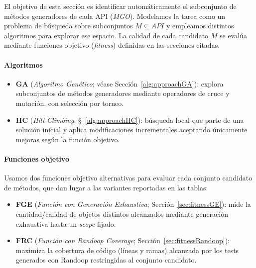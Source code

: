 El objetivo de esta sección es identificar automáticamente el subconjunto de métodos generadores de cada API (\emph{MGO}). 
Modelamos la tarea como un problema de búsqueda sobre subconjuntos \(M \subseteq API\) y empleamos distintos algoritmos 
para explorar ese espacio. La calidad de cada candidato \(M\) se evalúa mediante funciones objetivo 
(\emph{fitness}) definidas en las secciones citadas.

\paragraph{Algoritmos}
\begin{itemize}
  \item \textbf{GA} (\emph{Algoritmo Genético}; véase Sección~\ref{alg:approachGA}): explora subconjuntos de métodos generadores mediante operadores de cruce y mutación, con selección por torneo.
  \item \textbf{HC} (\emph{Hill-Climbing}; \S~\ref{alg:approachHC}): búsqueda local que parte de una solución inicial y aplica modificaciones incrementales aceptando únicamente mejoras según la función objetivo.
\end{itemize}

\paragraph{Funciones objetivo}
Usamos dos funciones objetivo alternativas para evaluar cada conjunto candidato de métodos, 
que dan lugar a las variantes reportadas en las tablas:

\begin{itemize}
  \item \textbf{FGE} (\emph{Función con Generación Exhaustiva}; Sección~\ref{sec:fitnessGE}):
mide la cantidad/calidad de objetos distintos alcanzados mediante generación exhaustiva hasta un \emph{scope} fijado.
  \item \textbf{FRC} (\emph{Función con Randoop Coverage}; Sección~\ref{sec:fitnessRandoop}): maximiza la cobertura de código (líneas y ramas) alcanzada por los tests generados con Randoop restringidas al conjunto candidato. 
\end{itemize}



